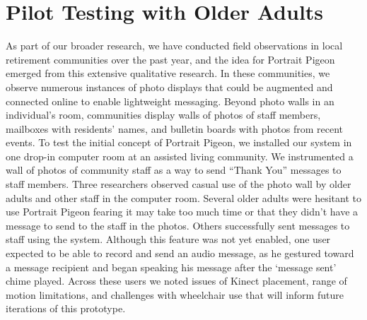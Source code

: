 \documentclass{chi-ext}
\begin{document}
\section{Pilot Testing with Older Adults}
As part of our broader research, we have conducted field observations in local retirement communities over the past year, and the idea for Portrait Pigeon emerged from this extensive qualitative research. In these communities, we observe numerous instances of photo displays that could be augmented and connected online to enable lightweight messaging. Beyond photo walls in an individual's room, communities display walls of photos of staff members, mailboxes with residents' names, and bulletin boards with photos from recent events. To test the initial concept of Portrait Pigeon, we installed our system in one drop-in computer room at an assisted living community. We instrumented a wall of photos of community staff as a way to send ``Thank You'' messages to staff members. Three researchers observed casual use of the photo wall by older adults and other staff in the computer room. Several older adults were hesitant to use Portrait Pigeon fearing it may take too much time or that they didn't have a message to send to the staff in the photos. Others successfully sent messages to staff using the system. Although this feature was not yet enabled, one user expected to be able to record and send an audio message, as he gestured toward a message recipient and began speaking his message after the `message sent' chime played. Across these users we noted issues of Kinect placement, range of motion limitations, and challenges with wheelchair use that will inform future iterations of this prototype. 




\end{document}
